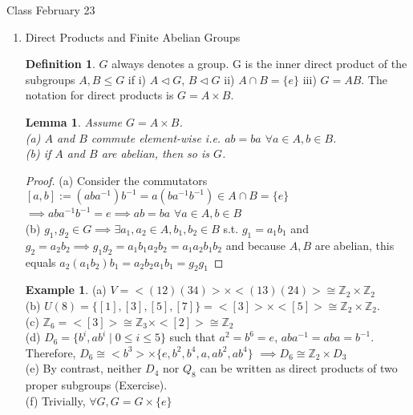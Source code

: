 \documentclass[11pt]{article}
\newtheorem{lem}[thm]{Lemma}
\theoremstyle{definition}
\newtheorem{definition}[thm]{Definition}
\newtheorem{example}[thm]{Example}
\numberwithin{equation}{section}
\newcommand{\Z}{\mathbb{Z}}
\begin{document}
\begin{center}
{\sf\LARGE Class February 23}
\end{center}

\begin{enumerate} %

\item Direct Products and Finite Abelian Groups
\begin{definition}
$G$ always denotes a group. G is the inner direct product of the subgroups $A, B \leq G$ if i) $A \vartriangleleft G$, $B \vartriangleleft G$ ii) $A \cap B = \{e\}$ iii) $G = AB$. The notation for direct products is $G = A \times B$.
\end{definition}
\begin{lem}
Assume $G = A \times B$. \\
(a) $A$ and $B$ commute element-wise i.e. $ab = ba$ $\forall a \in A, b \in B$.\\
(b) if $A$ and $B$ are abelian, then so is $G$.
\end{lem}
\begin{proof}
(a) Consider the commutators $[a, b] := (aba^{-1})b^{-1} = a(ba^{-1}b^{-1}) \in A \cap B = \{e\}$\\
$\implies aba^{-1}b^{-1} = e \implies ab = ba$ $\forall a \in A, b \in B$\\
(b) $g_1, g_2 \in G \implies \exists a_1, a_2 \in A, b_1, b_2 \in B$ s.t. $g_1 = a_{1}b_{1}$ and $g_2 = a_{2}b_{2} \implies g_{1}g_{2} = a_{1}b_{1}a_{2}b_{2} = a_{1}a_{2}b_{1}b_{2}$ and because $A, B$ are abelian, this equals $a_{2}(a_{1}b_{2})b_{1} = a_{2}b_{2}a_{1}b_{1} = g_{2}g_{1}$
\end{proof}
\begin{example}
(a) $V = <(12)(34)> \times <(13)(24)> \cong \Z_2 \times \Z_2 $\\
(b) $U(8) = \{[1], [3], [5], [7]\} = <[3]> \times <[5]> \cong \Z_2 \times \Z_2$.\\
(c) $\Z_6 = <[3]> \cong \Z_3 \times <[2]> \cong \Z_2$\\
(d) $D_6 = \{b^{i}, ab^{i} \mid 0 \leq i \leq 5 \}$ such that $a^{2} = b^{6} = e$, $aba^{-1} = aba = b^{-1}$. Therefore, $D_6 \cong <b^{3}> \times \{e, b^{2}, b^{4}, a, ab^{2}, ab^{4}\}$ $\implies D_6 \cong \Z_2 \times D_3$\\
(e) By contrast, neither $D_4$ nor $Q_8$ can be written as direct products of two proper subgroups (Exercise).\\
(f) Trivially, $\forall G, G = G \times \{e\}$

\end{example}
\end{enumerate}
\end{document}
